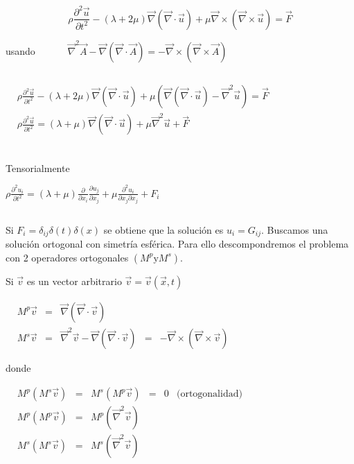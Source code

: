 \documentclass[a4paper,12pt]{article}
\begin{document}
\begin{center}
\begin{equation}
\rho \frac{\partial^2\vec u}{\partial t^2} - (\lambda + 2\mu)\vec\nabla(\vec\nabla\cdot\vec u) + \mu\vec\nabla\times(\vec\nabla\times\vec u)=\vec F 
\end{equation}
\end{center}

 usando $\quad\quad\quad\vec\nabla ^2\vec A - \vec\nabla(\vec\nabla\cdot\vec A) = -\vec\nabla\times(\vec\nabla\times\vec A)$
 
 $\quad$
 
$\begin{array}{cc}
          &      \rho \frac{\partial^2\vec u}{\partial t^2} - (\lambda + 2\mu)\vec\nabla(\vec\nabla\cdot\vec u) + \mu( \vec\nabla(\vec\nabla\cdot\vec u)-\vec\nabla ^2\vec u )=\vec F \\
          &
          \rho \frac{\partial^2\vec u}{\partial t^2}=(\lambda + \mu)\vec\nabla(\vec\nabla\cdot\vec u)+\mu\vec\nabla^2\vec u + \vec F \\
\end{array}$

$\quad$
\begin{center}
Tensorialmente
\end{center}
\begin{center}$\boxed{\rho \frac{\partial^2 u_i}{\partial
t^2}=(\lambda+\mu)\frac{\partial}{\partial x_i}\frac{\partial u_j}{\partial
x_j}+\mu\frac{\partial^2 u_i}{\partial x_j \partial x_j} + F_i}$
\end{center}
 
$\quad$
 
Si $F_i=\delta_{ij}\delta(t)\delta(x)$ se obtiene que la solución es $u_i=G_{ij}$.
Buscamos una solución ortogonal con simetría esférica. Para ello descompondremos el problema con 2 operadores ortogonales $(M^p \text{y} M^s)$.
 
Si $\vec v$ es un vector arbitrario $\vec v=\vec v(\vec x, t)$

$
    \begin{array}{rclclc}
         &M^p\vec v&=&\vec\nabla(\vec\nabla\cdot\vec v)  \\
             &M^s\vec v&=&\vec\nabla^2\vec v-\vec\nabla(\vec\nabla\cdot\vec v)&=&-\vec\nabla\times(\vec\nabla\times\vec v)
    \end{array}
$
\begin{center}
donde
\end{center}
$
\begin{array}{rclclcr}
    & M^p(M^s\vec v)&=&M^s(M^p\vec v)&=&0&\text{(ortogonalidad)} \\
        & M^p(M^p\vec v)&=&M^p(\vec\nabla^2\vec v)\\
        &M^s(M^s\vec v)&=&M^s(\vec\nabla^2\vec v)
\end{array}$
\end{document}
